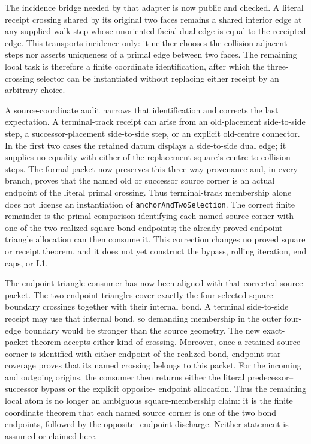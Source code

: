 \documentclass[11pt]{article}
\theoremstyle{definition}
\begin{document}
The incidence bridge needed by that adapter is now public and checked.  A
literal receipt crossing shared by its original two faces remains a shared
interior edge at any supplied walk step whose unoriented facial-dual edge is
equal to the receipted edge.  This transports incidence only: it neither
chooses the collision-adjacent steps nor asserts uniqueness of a primal edge
between two faces.  The remaining local task is therefore a finite coordinate
identification, after which the three-crossing selector can be instantiated
without replacing either receipt by an arbitrary choice.

A source-coordinate audit narrows that identification and corrects the last
expectation.  A terminal-track receipt can arise from an old-placement
side-to-side step, a successor-placement side-to-side step, or an explicit
old-centre connector.  In the first two cases the retained datum displays a
side-to-side dual edge; it supplies no equality with either of the replacement
square's centre-to-collision steps.  The formal packet now preserves this
three-way provenance and, in every branch, proves that the named old or
successor source corner is an actual endpoint of the literal primal crossing.
Thus terminal-track membership alone does not license an instantiation of
\texttt{anchorAndTwoSelection}.  The correct finite
remainder is the primal comparison identifying each named source corner with
one of the two realized square-bond endpoints; the already proved endpoint-
triangle allocation can then consume it.  This correction changes no proved
square or receipt theorem, and it does not yet construct the bypass, rolling
iteration, end caps, or L1.

The endpoint-triangle consumer has now been aligned with that corrected
source packet.  The two endpoint triangles cover exactly the four selected
square-boundary crossings together with their internal bond.  A terminal
side-to-side receipt may use that internal bond, so demanding membership in
the outer four-edge boundary would be stronger than the source geometry.  The
new exact-packet theorem accepts either kind of crossing.  Moreover, once a
retained source corner is identified with either endpoint of the realized
bond, endpoint-star coverage proves that its named crossing belongs to this
packet.  For the incoming and outgoing origins, the consumer then returns
either the literal predecessor--successor bypass or the explicit opposite-
endpoint allocation.  Thus the remaining local atom is no longer an ambiguous
square-membership claim: it is the finite coordinate theorem that each named
source corner is one of the two bond endpoints, followed by the opposite-
endpoint discharge.  Neither statement is assumed or claimed here.
\end{document}
